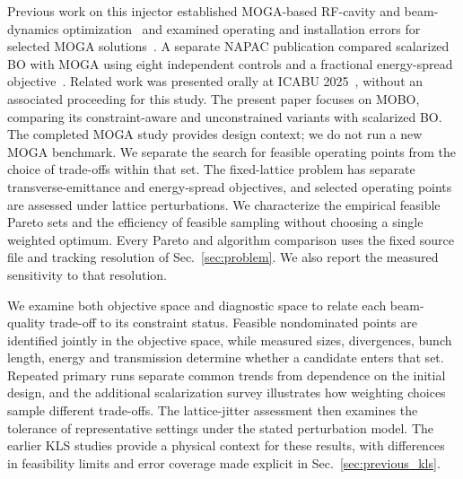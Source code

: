 \documentclass[aps,prab,reprint,superscriptaddress,amsmath,amssymb,floatfix]{revtex4-2}
\begin{document}
Previous work on this injector established MOGA-based RF-cavity and beam-dynamics
optimization~\cite{Kim2024KLSMOGA} and examined operating and installation errors for selected
MOGA solutions~\cite{Kim2025KLSError}. A separate NAPAC publication compared scalarized BO with
MOGA using eight independent controls and a fractional energy-spread
objective~\cite{Park2025NAPAC}. Related work was presented orally at ICABU
2025~\cite{Park2025ICABU}, without an associated proceeding for this study. The present paper
focuses on MOBO, comparing its constraint-aware and unconstrained variants with scalarized BO.
The completed MOGA study provides design context; we do not run a new MOGA benchmark. We
separate the search for feasible operating points from the choice of trade-offs within that set.
The fixed-lattice problem has separate transverse-emittance and energy-spread objectives, and
selected operating points are assessed under lattice perturbations. We characterize the
empirical feasible Pareto sets and the efficiency of feasible sampling without choosing a single
weighted optimum. Every Pareto and algorithm comparison uses the fixed source file and tracking
resolution of Sec.~\ref{sec:problem}. We also report the measured sensitivity to that
resolution.

We examine both objective space and diagnostic space to relate each beam-quality trade-off to
its constraint status. Feasible nondominated points are identified jointly in the objective
space, while measured sizes, divergences, bunch length, energy and transmission determine
whether a candidate enters that set. Repeated primary runs separate common trends from
dependence on the initial design, and the additional scalarization survey illustrates how
weighting choices sample different trade-offs. The lattice-jitter assessment then examines the
tolerance of representative settings under the stated perturbation model. The earlier KLS
studies provide a physical context for these results, with differences in feasibility limits and
error coverage made explicit in Sec.~\ref{sec:previous_kls}.
\end{document}
